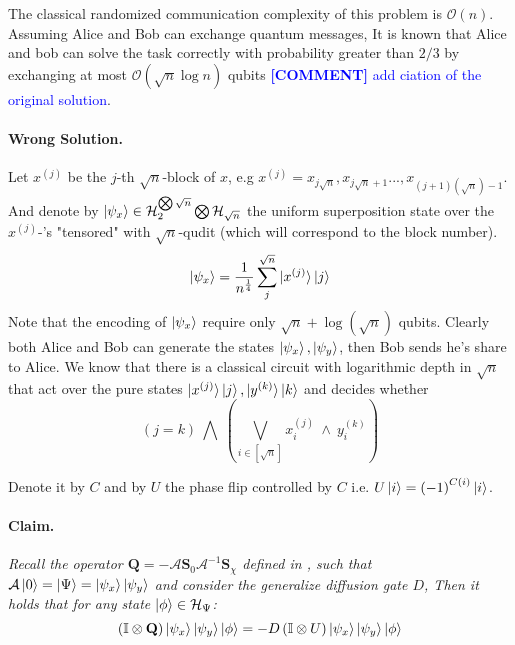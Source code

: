 \documentclass{article}
\newcommand{\commentt}[1]{\textcolor{blue}{ \textbf{[COMMENT]} #1}}
\newcommand{\ctt}[1]{\commentt{#1}}
\newcommand{\onotation}[1]{\(\mathcal{O} \left( {#1}  \right) \)}
\newcommand{\ona}[1]{\onotation{#1}}
\begin{document}
\begin{multicols*}{2}
The classical randomized communication complexity of this problem is \ona{n}.
Assuming Alice and Bob can exchange quantum messages, It is known that Alice and bob can solve the task
correctly with probability greater than \(2/3\) by exchanging at most \ona{\sqrt{n}\log n } qubits \ctt{add ciation of the original solution}. 


\paragraph{Wrong Solution.}
Let \( x^{(j)} \) be the \(j\)-th \(\sqrt{n}\)-block of \(x\), e.g \(x^{(j)} = x_{j\sqrt{n}},x_{j\sqrt{n}+1}...,x_{(j+1)(\sqrt{n})-1}  \). And denote by \( \ket{\psi_x} \in \mathcal{H}_{2}^{\bigotimes \sqrt{n}} \bigotimes \mathcal{H}_{\sqrt{n}} \) the uniform superposition state over the \( x^{(j)}\)-'s "tensored" with \(\sqrt{n}\)-qudit (which will correspond to the block number). 
\[ \ket{\psi_x} = \frac{1}{n^\frac{1}{4}}\sum_{j}^{\sqrt{n}}\ket{x^{(j)}}\ket{j} \] Note that the encoding of \( \ket{\psi_x} \) require only \( \sqrt{n} + \log(\sqrt{n}) \) qubits.
Clearly both Alice and Bob can generate the states \( \ket{\psi_x}, \ket{\psi_y} \), then Bob sends he's share to Alice.
We know that there is a classical circuit with logarithmic depth in \( \sqrt{n} \) that act over the pure states \( \ket{x^{(j)}}\ket{j} , \ket{y^{(k)}}\ket{k} \) and decides whether \[ \left( j =  k \right) \ \bigwedge  \ \left( \bigvee_{i \in [ \sqrt{n} ] } x^{(j)}_{i} \ \wedge \  y^{(k)}_{i} \right)   \]


Denote it by \( C \) and by \( U \) the phase flip controlled by $C$ i.e. $U\ket{i}=\left( -1 \right)^{C\left( i \right)}\ket{i}$.

\paragraph{Claim.} \textit{ Recall the operator $\mathbf Q  = - {\mathcal A}  {\mathbf S}_0 
  {\mathcal A}^{-1}  {\mathbf S}_\chi$ defined in \cite{Brassard_2002}, such that $ \mathcal A \ket{0} = \ket{\Psi} = \ket{\psi_{x}}\ket{\psi_{y}}$ and 
consider the generalize diffusion gate $D$, Then it holds that for any state $ \ket{\phi} \in \mathcal{H}_{\Psi} $:}
\begin{equation*}
  \left(  \mathbb{I} \otimes \mathbf Q \right) \ket{\psi_{x}}\ket{\psi_{y}} \ket{\phi} =  - D \left( \mathbb{I} \otimes U \right)  \ket{\psi_{x}}\ket{\psi_{y}} \ket{\phi} 
\end{equation*}


\end{multicols*}
\end{document}
